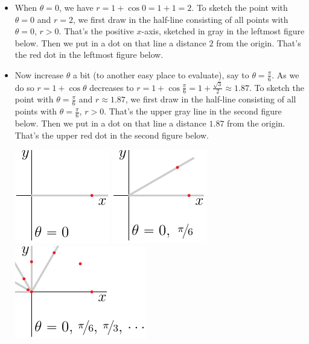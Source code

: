 \begin{eg}
\begin{itemize}
\item 
When $\theta=0$, we have $r=1+\cos 0 = 1+1=2$. To sketch the
point with $\theta=0$ and $r=2$, we first draw in the half-line consisting 
of all points with $\theta=0$, $r>0$. That's the positive $x$-axis, 
sketched in gray in the leftmost figure below. Then we put in a dot on that line
a distance $2$ from the origin. That's the red dot in the leftmost figure below.
\item
Now increase $\theta$ a bit (to another easy place to evaluate), 
say to $\theta=\frac{\pi}{6}$.
As we do so $r=1+\cos\theta$ decreases to 
$r=1+\cos\frac{\pi}{6} = 1+\frac{\sqrt{3}}{2}\approx 1.87$.
To sketch the point with $\theta=\frac{\pi}{6}$ and $r\approx 1.87$, 
we first draw in the half-line consisting of all points with $\theta=\frac{\pi}{6}$, $r>0$. 
That's the upper gray line in the second figure below.
Then we put in a dot on that line a distance $1.87$ from the origin. 
That's the upper red dot in the second figure below.
\begin{efig}
\begin{center}
    \includegraphics{cardioid1.pdf}\qquad\qquad
    \includegraphics{cardioid2.pdf}\qquad\qquad
    \includegraphics{cardioid3.pdf}
\end{center}
\end{efig}


\end{itemize}
\end{eg}
